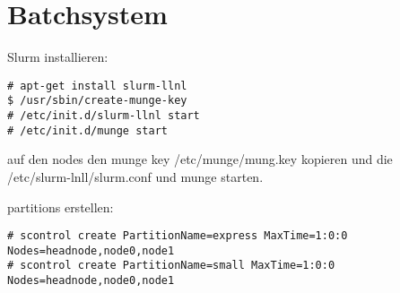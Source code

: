 \chapter{Batchsystem}
Slurm installieren:
\begin{lstlisting}[style=Bash]
# apt-get install slurm-llnl
$ /usr/sbin/create-munge-key
# /etc/init.d/slurm-llnl start
# /etc/init.d/munge start

\end{lstlisting}
auf den nodes den munge key /etc/munge/mung.key kopieren und die /etc/slurm-lnll/slurm.conf
und munge starten.

partitions erstellen:
\begin{lstlisting}[style=Bash]
# scontrol create PartitionName=express MaxTime=1:0:0 Nodes=headnode,node0,node1
# scontrol create PartitionName=small MaxTime=1:0:0 Nodes=headnode,node0,node1
\end{lstlisting}


